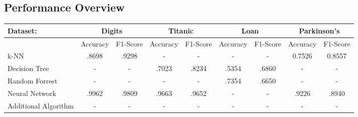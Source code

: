 \documentclass{article}
\begin{document}
\subsection*{Performance Overview}



\begin{table}[h]
    \begin{tabular}{l|cc|cc|cc|cc}
    Dataset:             & \multicolumn{2}{c|}{Digits}                                   & \multicolumn{2}{c|}{Titanic}                                  & \multicolumn{2}{c|}{Loan}                                     & \multicolumn{2}{c}{Parkinson's}                               \\ \hline
                         & Accuracy                      & F1-Score                      & Accuracy                      & F1-Score                      & Accuracy                      & F1-Score                      & Accuracy                      & F1-Score                      \\ \cline{2-9} 
    k-NN                 & .8698                         & .9298                         & -                             & -                             & -                             & -                             & 0.7526                        & 0.8557                             \\
    Decision Tree        & -                             & -                             & .7023                         & .8234                         & .5354                         & \cellcolor[HTML]{C0C0C0}.6860 & -                             & -                             \\
    Random Forrest       & -                             & -                             & -                             & -                             & \cellcolor[HTML]{C0C0C0}.7354 & .6650                         & -                             & -                             \\
    Neural Network       & \cellcolor[HTML]{C0C0C0}.9962 & \cellcolor[HTML]{C0C0C0}.9809 & \cellcolor[HTML]{C0C0C0}.9663 & \cellcolor[HTML]{C0C0C0}.9652 & -                             & -                             & \cellcolor[HTML]{C0C0C0}.9226 & \cellcolor[HTML]{C0C0C0}.8940 \\
    Additional Algorithm & -                             & -                             & -                             & -                             & -                             & -                             & -                             & -                            
    \end{tabular}
    \end{table}
\restoregeometry
\end{document}
